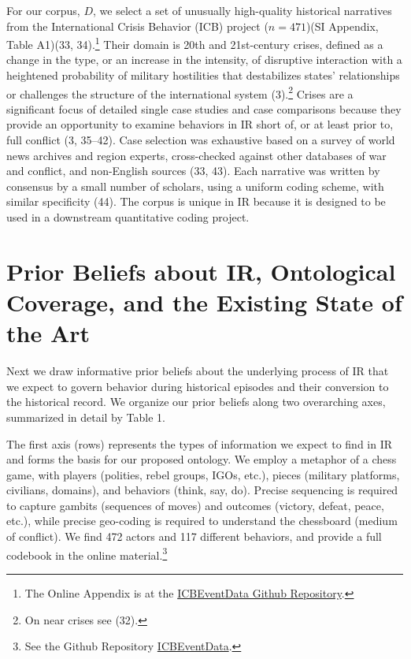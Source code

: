\documentclass[9pt,twocolumn,twoside,lineno]{pnas-new}
\begin{document}
For our corpus, \(D\), we select a set of unusually high-quality
historical narratives from the International Crisis Behavior (ICB)
project (\(n=471\))(SI Appendix, Table A1)(33, 34).\footnote{The Online
  Appendix is at the
  \href{https://urldefense.com/v3/__https://github.com/CenterForPeaceAndSecurityStudies/ICBEventData__;!!Mih3wA!WxDJtEczKfxGTh0S2Krunap8ReymFEL5iTWaSfOHeqlSdyfRx77zmjBSWO1OAm13$}{ICBEventData
  Github Repository}.} Their domain is 20th and 21st-century crises,
defined as a change in the type, or an increase in the intensity, of
disruptive interaction with a heightened probability of military
hostilities that destabilizes states' relationships or challenges the
structure of the international system (3).\footnote{On near crises see
  (32).} Crises are a significant focus of detailed single case studies
and case comparisons because they provide an opportunity to examine
behaviors in IR short of, or at least prior to, full conflict (3,
35--42). Case selection was exhaustive based on a survey of world news
archives and region experts, cross-checked against other databases of
war and conflict, and non-English sources (33, 43). Each narrative was
written by consensus by a small number of scholars, using a uniform
coding scheme, with similar specificity (44). The corpus is unique in IR
because it is designed to be used in a downstream quantitative coding
project.

\hypertarget{prior-beliefs-about-ir-ontological-coverage-and-the-existing-state-of-the-art}{%
\section*{Prior Beliefs about IR, Ontological Coverage, and the Existing
State of the
Art}\label{prior-beliefs-about-ir-ontological-coverage-and-the-existing-state-of-the-art}}

Next we draw informative prior beliefs about the underlying process of
IR that we expect to govern behavior during historical episodes and
their conversion to the historical record. We organize our prior beliefs
along two overarching axes, summarized in detail by Table 1.

The first axis (rows) represents the types of information we expect to
find in IR and forms the basis for our proposed ontology. We employ a
metaphor of a chess game, with players (polities, rebel groups, IGOs,
etc.), pieces (military platforms, civilians, domains), and behaviors
(think, say, do). Precise sequencing is required to capture gambits
(sequences of moves) and outcomes (victory, defeat, peace, etc.), while
precise geo-coding is required to understand the chessboard (medium of
conflict). We find 472 actors and 117 different behaviors, and provide a
full codebook in the online material.\footnote{See the Github Repository
  \href{https://urldefense.com/v3/__https://github.com/CenterForPeaceAndSecurityStudies/ICBEventData__;!!Mih3wA!WxDJtEczKfxGTh0S2Krunap8ReymFEL5iTWaSfOHeqlSdyfRx77zmjBSWO1OAm13$}{ICBEventData}.}
\end{document}

